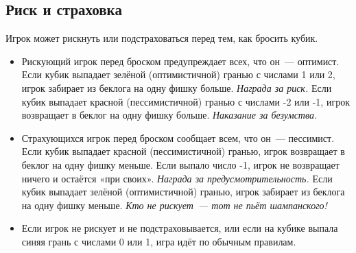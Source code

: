 \subsection*{Риск и страховка}

Игрок может рискнуть или подстраховаться перед тем, как бросить кубик.

\begin{itemize}
    \item Рискующий игрок перед броском предупреждает всех, что он — оптимист.
    Если кубик выпадает зелёной (оптимистичной) гранью с числами 1 или 2, игрок забирает из беклога на одну фишку больше.
    \textit{Награда за риск.}
    Если кубик выпадает красной (пессимистичной) гранью с числами -2 или -1, игрок возвращает в беклог на одну фишку больше.
    \textit{Наказание за безумства.}

    \item Страхующихся игрок перед броском сообщает всем, что он — пессимист.
    Если кубик выпадает красной (пессимистичной) гранью, игрок возвращает в беклог на одну фишку меньше.
    Если выпало число -1, игрок не возвращает ничего и остаётся «при своих».
    \textit{Награда за предусмотрительность.}
    Если кубик выпадает зелёной (оптимистичной) гранью, игрок забирает из беклога на одну фишку меньше.
    \textit{Кто не рискует — тот не пьёт шампанского!}

    \item Если игрок не рискует и не подстраховывается, или если на кубике выпала синяя грань с числами 0 или 1, игра идёт по обычным правилам.
\end{itemize}



